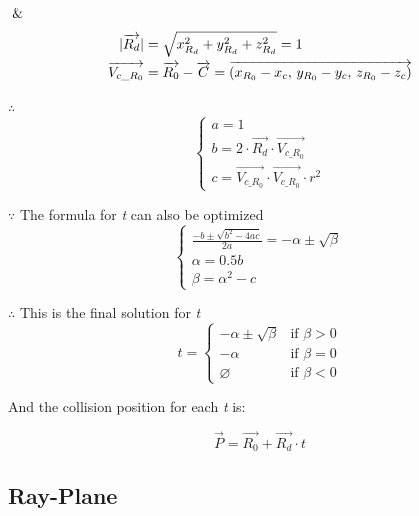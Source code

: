 $\And$
\[
\begin{array}{lr}
\begin{aligned}
\lvert \overrightarrow{R_d} \rvert &= \sqrt{x_{R_d}^2 + y_{R_d}^2 + z_{R_d}^2} = 1 \\
\overrightarrow{V_{c\_R_0}} &= \overrightarrow{R_0} - \overrightarrow{C} = \overrightarrow{(x_{R_0} - x_c,\,y_{R_0} - y_c,\,z_{R_0} - z_c)}
\end{aligned}
\end{array}
\]

$\therefore$
\[
\left\{
\begin{array}{lr}
a =1 \\
b = 2 \cdot \overrightarrow{R_d} \cdot \overrightarrow{V_{c\_R_0}} \\
c = \overrightarrow{V_{c\_R_0}} \cdot \overrightarrow{V_{c\_R_0}} \cdot r^2
\end{array}
\right.
\]

$\because$ The formula for \emph{t} can also be optimized
\[
\left\{
\begin{array}{lr}
\frac{-b \pm \sqrt{b^2 - 4ac}}{2a} = -\alpha \pm \sqrt{\beta} \\
\alpha = 0.5b \\
\beta = \alpha^2 - c
\end{array}
\right.
\]

$\therefore$ This is the final solution for \emph{t}
\[
t =
\begin{cases}
 -\alpha \pm \sqrt{\beta} & \text{if } \beta > 0 \\
-\alpha & \text{if } \beta = 0 \\
\varnothing & \text{if } \beta < 0
\end{cases}
\]

And the collision position for each \emph{t} is:

\[
\overrightarrow{P} = \overrightarrow{R_0} + \overrightarrow{R_d} \cdot t
\]

\subsection{Ray-Plane}

